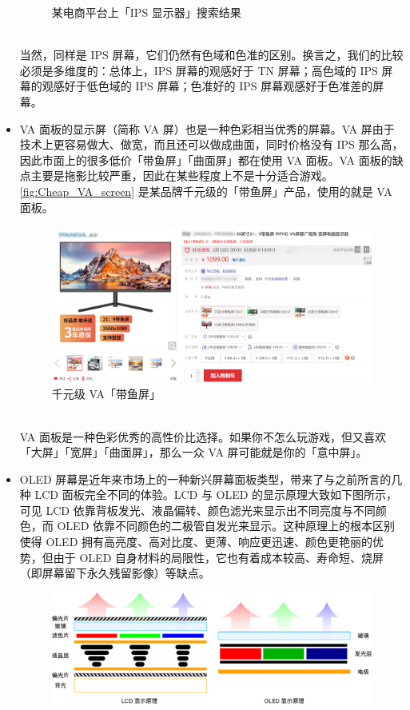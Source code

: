 \begin{itemize}
\begin{figure}[htb!]
      \caption{某电商平台上「IPS 显示器」搜索结果}
      \label{fig:IPS_screens}
    \end{figure}\\
    当然，同样是 IPS 屏幕，它们仍然有色域和色准的区别。换言之，我们的比较必须是多维度的：总体上，IPS 屏幕的观感好于 TN 屏幕；高色域的 IPS 屏幕的观感好于低色域的 IPS 屏幕；色准好的 IPS 屏幕观感好于色准差的屏幕。
  \item VA 面板的显示屏（简称 VA 屏）也是一种色彩相当优秀的屏幕。VA 屏由于技术上更容易做大、做宽，而且还可以做成曲面，同时价格没有 IPS 那么高，因此市面上的很多低价「带鱼屏」「曲面屏」都在使用 VA 面板。VA 面板的缺点主要是拖影比较严重，因此在某些程度上不是十分适合游戏。\autoref{fig:Cheap_VA_screen} 是某品牌千元级的「带鱼屏」产品，使用的就是 VA 面板。
    \begin{figure}[htb!]
      \centering
      \includegraphics[width=.8\textwidth]{assets/advanced/Cheap_VA_screen.png}
      \caption{千元级 VA「带鱼屏」}
      \label{fig:Cheap_VA_screen}
    \end{figure}\\
    VA 面板是一种色彩优秀的高性价比选择。如果你不怎么玩游戏，但又喜欢「大屏」「宽屏」「曲面屏」，那么一众 VA 屏可能就是你的「意中屏」。
  \item OLED 屏幕是近年来市场上的一种新兴屏幕面板类型，带来了与之前所言的几种 LCD 面板完全不同的体验。LCD 与 OLED 的显示原理大致如下图所示，可见 LCD 依靠背板发光、液晶偏转、颜色滤光来显示出不同亮度与不同颜色，而 OLED 依靠不同颜色的二极管自发光来显示。这种原理上的根本区别使得 OLED 拥有高亮度、高对比度、更薄、响应更迅速、颜色更艳丽的优势，但由于 OLED 自身材料的局限性，它也有着成本较高、寿命短、烧屏（即屏幕留下永久残留影像）等缺点。
    \begin{figure}[htb!]
      \centering
      \includegraphics[width=.95\textwidth]{assets/advanced/LCD_OLED.pdf}

\end{figure}
\end{itemize}
